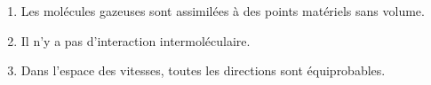 ﻿\documentclass[a4paper]{article}
\begin{document}
\pagestyle{fancy}
\fancyhf{}
\setlength{\headheight}{15pt}

\begin{center}
	\large{}
\end{center}


\begin{enumerate}
	\item Les molécules gazeuses sont assimilées à des points matériels sans volume.
	\item Il n'y a pas d'interaction intermoléculaire.
	\item Dans l'espace des vitesses, toutes les directions sont équiprobables.
\end{enumerate}
\end{document}
